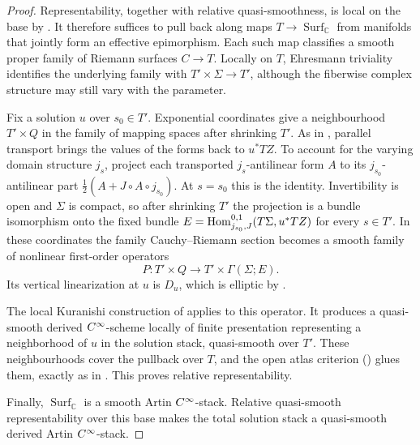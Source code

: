 \begin{proof}
  Representability, together with relative quasi-smoothness, is local on
  the base by . It therefore
  suffices to pull back along maps $T\to\operatorname{Surf}_{\mathbb C}$
  from manifolds that jointly form an effective epimorphism. Each such map classifies a
  smooth proper family of Riemann surfaces $C\to T$. Locally on $T$, Ehresmann
  triviality identifies the underlying family with
  $T'\times\Sigma\to T'$, although the fiberwise complex structure may still
  vary with the parameter.

  Fix a solution $u$ over $s_0\in T'$. Exponential coordinates give a
  neighbourhood $T'\times Q$ in the family of mapping spaces after
  shrinking $T'$. As in ,
  parallel transport brings the values of the forms back to $u^*TZ$.
  To account for the varying domain structure $j_s$, project each
  transported $j_s$-antilinear form $A$ to its $j_{s_0}$-antilinear
  part $\tfrac12(A+J\circ A\circ j_{s_0})$. At $s=s_0$ this is the
  identity. Invertibility is open and $\Sigma$ is compact, so after
  shrinking $T'$ the projection is a bundle isomorphism onto the fixed
  bundle $E=\operatorname{Hom}^{0,1}_{j_{s_0},J}(T\Sigma,u^*TZ)$ for every $s\in T'$.
  In these coordinates the family Cauchy--Riemann section becomes a
  smooth family of nonlinear first-order operators
  \begin{equation}
    \label{eq:Family_Local_Cauchy_Riemann_Operator_Fourteen}
    P\colon
    T'\times Q
    \longrightarrow
    T'\times\Gamma(\Sigma;E).
  \end{equation}
  Its vertical linearization at $u$ is $D_u$, which is elliptic by
  .

  The local Kuranishi construction of  applies to
  this operator. It produces a quasi-smooth derived
  $C^\infty$-scheme locally of finite presentation representing a neighborhood
  of $u$ in the solution stack, quasi-smooth over $T'$. These neighbourhoods
  cover the pullback over $T$, and the open atlas criterion
  () glues them, exactly as in
  . This proves relative
  representability.

  Finally, $\operatorname{Surf}_{\mathbb C}$ is a smooth Artin
  $C^\infty$-stack. Relative quasi-smooth representability over this base makes
  the total solution stack a quasi-smooth derived Artin $C^\infty$-stack.
\end{proof}

